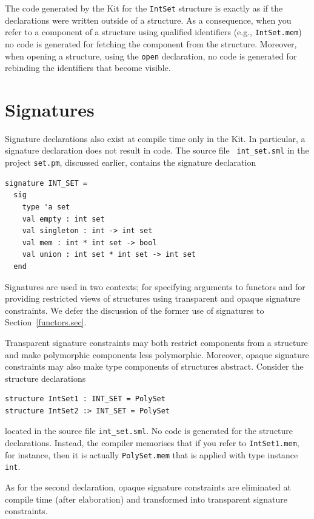 \documentclass[12pt]{book}
\begin{document}
\noindent
The code generated by the Kit for the {\tt IntSet} structure is
exactly as if the declarations were written outside of a structure.
As a consequence, when you refer to a component of a structure using
qualified identifiers (e.g., {\tt IntSet.mem}) no code is generated
for fetching the component from the structure. Moreover, when opening
a structure, using the {\tt open} declaration, no code is generated
for rebinding the identifiers that become visible.

\section{Signatures}
Signature declarations also exist at compile
time only in the Kit. In particular, a signature declaration does not
result in code. The source file {\tt
int\_set.sml} in the project {\tt set.pm}, discussed earlier, contains
the signature declaration
\begin{verbatim}
signature INT_SET =
  sig
    type 'a set
    val empty : int set
    val singleton : int -> int set
    val mem : int * int set -> bool
    val union : int set * int set -> int set
  end
\end{verbatim}

Signatures are used in two contexts; for specifying arguments to
functors and for providing restricted views of structures using
transparent and opaque signature constraints. We defer the discussion
of the former use of signatures to Section~\ref{functors.sec}.

Transparent signature constraints may both restrict components from a
structure and make polymorphic components less polymorphic. Moreover,
opaque signature constraints may also make type components of
structures abstract. Consider the structure 
declarations
\begin{verbatim}
structure IntSet1 : INT_SET = PolySet
structure IntSet2 :> INT_SET = PolySet
\end{verbatim}

\noindent
located in the source file {\tt int\_set.sml}. No code is generated
for the structure declarations. Instead, the compiler memorises that
if you refer to {\tt IntSet1.mem}, for instance, then it is actually
{\tt PolySet.mem} that is applied with type instance {\tt int}.

As for the second declaration, opaque signature constraints are
eliminated at compile time (after elaboration) and transformed into
transparent signature constraints.
\end{document}
